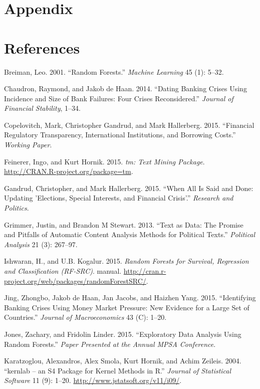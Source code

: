 \documentclass[]{article}
\begin{document}
\section{Appendix}\label{appendix}

\section*{References}\label{references}

Breiman, Leo. 2001. ``Random Forests.'' \emph{Machine Learning} 45 (1):
5--32.

Chaudron, Raymond, and Jakob de Haan. 2014. ``Dating Banking Crises
Using Incidence and Size of Bank Failures: Four Crises Reconsidered.''
\emph{Journal of Financial Stability}, 1--34.

Copelovitch, Mark, Christopher Gandrud, and Mark Hallerberg. 2015.
``Financial Regulatory Transparency, International Institutions, and
Borrowing Costs.'' \emph{Working Paper}.

Feinerer, Ingo, and Kurt Hornik. 2015. \emph{tm: Text Mining Package}.
\url{http://CRAN.R-project.org/package=tm}.

Gandrud, Christopher, and Mark Hallerberg. 2015. ``When All Is Said and
Done: Updating 'Elections, Special Interests, and Financial Crisis'.''
\emph{Research and Politics}.

Grimmer, Justin, and Brandon M Stewart. 2013. ``Text as Data: The
Promise and Pitfalls of Automatic Content Analysis Methods for Political
Texts.'' \emph{Political Analysis} 21 (3): 267--97.

Ishwaran, H., and U.B. Kogalur. 2015. \emph{Random Forests for Survival,
Regression and Classification (RF-SRC)}. manual.
\url{http://cran.r-project.org/web/packages/randomForestSRC/}.

Jing, Zhongbo, Jakob de Haan, Jan Jacobs, and Haizhen Yang. 2015.
``Identifying Banking Crises Using Money Market Pressure: New Evidence
for a Large Set of Countries.'' \emph{Journal of Macroeconomics} 43 (C):
1--20.

Jones, Zachary, and Fridolin Linder. 2015. ``Exploratory Data Analysis
Using Random Forests.'' \emph{Paper Presented at the Annual MPSA
Conference}.

Karatzoglou, Alexandros, Alex Smola, Kurt Hornik, and Achim Zeileis.
2004. ``kernlab -- an S4 Package for Kernel Methods in R.''
\emph{Journal of Statistical Software} 11 (9): 1--20.
\url{http://www.jstatsoft.org/v11/i09/}.
\end{document}
